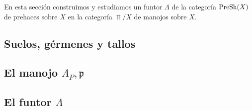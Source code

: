 En esta sección construimos y estudiamos un funtor $\Lambda$ de la categoría $\normalfont{\text{PreSh}}(X)$ de prehaces sobre $X$ en la categoría $\Top /X$ de manojos sobre $X$.
\subsection{Suelos, gérmenes y tallos}
   
\subsection{El manojo $\Lambda_{P},\mathfrak{p}$}
   
\subsection{El funtor $\Lambda$}
   
